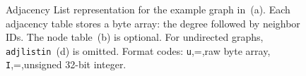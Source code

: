 \begin{figure}[t]
  \caption{Adjacency List representation for the example graph in~(a). Each adjacency table stores a byte array: the degree followed by neighbor IDs. The node table~(b) is optional. For undirected graphs, \texttt{adjlistin}~(d) is omitted.
  Format codes: \texttt{u},=,raw byte array, \texttt{I},=,unsigned 32-bit integer.}
  \label{fig:schema:adjlist}
\end{figure}
